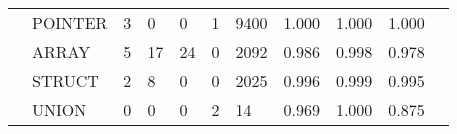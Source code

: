 \begin{table}
\begin{tabular}{lp{1.43cm}p{1.10cm}p{1.10cm}p{1.10cm}p{1.10cm}p{1.10cm}p{1.10cm}p{1.10cm}p{1.10cm}p{1.10cm}}
      & POINTER &                                  3 &                                 0 &                                0 &                                 1 &                            9400 &                     1.000 &                                 1.000 &                               1.000 \\
      & ARRAY &                                  5 &                                17 &                               24 &                                 0 &                            2092 &                     0.986 &                                 0.998 &                               0.978 \\
      & STRUCT &                                  2 &                                 8 &                                0 &                                 0 &                            2025 &                     0.996 &                                 0.999 &                               0.995 \\
      & UNION &                                  0 &                                 0 &                                0 &                                 2 &                              14 &                     0.969 &                                 1.000 &                               0.875 \\
\bottomrule
\end{tabular}
\end{table}
